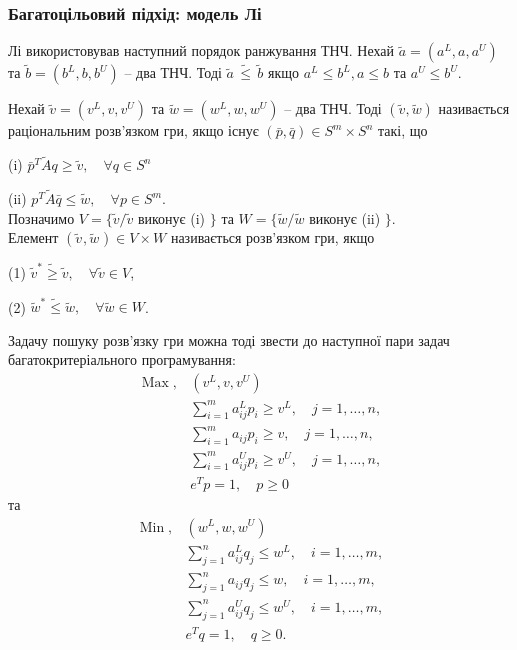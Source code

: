 \documentclass[14pt, a4paper, oneside]{extarticle}
\numberwithin{equation}{section}
\newcommand{\geqslant}{\geq}
\newcommand{\leqslant}{\leq}
\begin{document}
\subsubsection{Багатоцільовий підхід: модель Лі}
Лі використовував наступний порядок ранжування ТНЧ. 
Нехай $\tilde{a}=\left(a^{L}, a, a^{U}\right)$ та $\tilde{b}=\left(b^{L}, b, b^{U}\right)$ -- два ТНЧ.
$
\text{Тоді } \tilde{a} \,\tilde{\leqslant}\, \tilde{b} \text { якщо } a^{L} \leqslant b^{L}, a \leqslant b \text { та } a^{U}\leqslant b^{U}.
$

Нехай $\tilde{v}=\left(v^{L}, v, v^{U}\right)$ та $\tilde{w}=\left(w^{L}, w, w^{U}\right)$ -- два ТНЧ. Тоді $(\tilde{v}, \tilde{w})$ називається раціональним розв'язком гри, якщо існує $(\bar{p}, \bar{q}) \in S^{m} \times S^{n}$ такі, що

(i) $\bar{p}^{T} \tilde{A} q \geqslant \tilde{v}, \quad \forall q \in S^{n}$

(ii) $p^{T} \tilde{A} \bar{q} \leqslant \tilde{w}, \quad \forall p \in S^{m}$.\\
Позначимо $V=\{\tilde{v} / \tilde{v}$ виконує (i) $\}$ та $W=\{\tilde{w} / \tilde{w}$ виконує (ii) $\}$.\\
Елемент $\left(\tilde{v}^{}, \tilde{w}^{}\right) \in V \times W$ називається розв'язком гри, якщо

(1) $\tilde{v}^{*} \tilde{\geqslant} \tilde{v}, \quad \forall \tilde{v} \in V$,

(2) $\tilde{w}^{*} \tilde{\leqslant} \tilde{w}, \quad \forall \tilde{w} \in W$.

Задачу пошуку розв'язку гри можна тоді звести до наступної пари задач багатокритеріального програмування:
\begin{equation*}
\begin{aligned}
\operatorname{Max}, & \left(v^{L}, v, v^{U}\right) \\
& \sum_{i=1}^{m} a_{i j}^{L} p_{i} \geqslant v^{L}, \quad j=1, \ldots, n, \\
& \sum_{i=1}^{m} a_{i j} p_{i} \geqslant v, \quad j=1, \ldots, n, \\
& \sum_{i=1}^{m} a_{i j}^{U} p_{i} \geqslant v^{U}, \quad j=1, \ldots, n, \\
& e^{T} p=1, \quad p \geqslant 0
\end{aligned}
\end{equation*}
та
\begin{equation*}
\begin{aligned}
\operatorname{Min} , & \left(w^{L}, w, w^{U}\right) \\
& \sum_{j=1}^{n} a_{i j}^{L} q_{j} \leqslant w^{L}, \quad i=1, \ldots, m, \\
& \sum_{j=1}^{n} a_{i j} q_{j} \leqslant w, \quad i=1, \ldots, m, \\
& \sum_{j=1}^{n} a_{i j}^{U} q_{j} \leqslant w^{U}, \quad i=1, \ldots, m, \\
& e^{T} q=1, \quad q \geqslant 0 .
\end{aligned}
\end{equation*}
\end{document}
